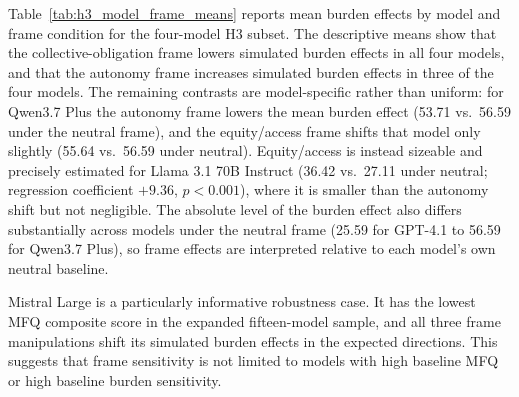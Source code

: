 \documentclass[11pt]{article}
\begin{document}
Table~\ref{tab:h3_model_frame_means} reports mean burden effects by model and frame condition for the four-model H3 subset. The descriptive means show that the collective-obligation frame lowers simulated burden effects in all four models, and that the autonomy frame increases simulated burden effects in three of the four models. The remaining contrasts are model-specific rather than uniform: for Qwen3.7 Plus the autonomy frame lowers the mean burden effect (53.71 vs.\ 56.59 under the neutral frame), and the equity/access frame shifts that model only slightly (55.64 vs.\ 56.59 under neutral). Equity/access is instead sizeable and precisely estimated for Llama 3.1 70B Instruct (36.42 vs.\ 27.11 under neutral; regression coefficient $+9.36$, $p<0.001$), where it is smaller than the autonomy shift but not negligible. The absolute level of the burden effect also differs substantially across models under the neutral frame (25.59 for GPT-4.1 to 56.59 for Qwen3.7 Plus), so frame effects are interpreted relative to each model's own neutral baseline.

Mistral Large is a particularly informative robustness case. It has the lowest MFQ composite score in the expanded fifteen-model sample, and all three frame manipulations shift its simulated burden effects in the expected directions. This suggests that frame sensitivity is not limited to models with high baseline MFQ or high baseline burden sensitivity.
\end{document}
